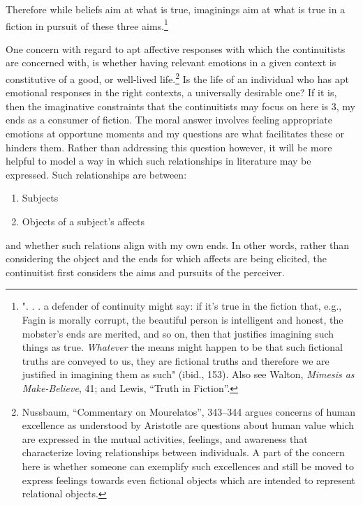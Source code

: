 \documentclass[phdthesis,12pt,final]{wuthesis}
\theoremstyle{definition}
\theoremstyle{definition}
\theoremstyle{definition}
\theoremstyle{definition}
\theoremstyle{remark}
\begin{document}
\noindent Therefore while beliefs aim at what is true, imaginings aim at what is true in a fiction in pursuit of these three aims.\footnote{". . . a defender of continuity might say: if it's true in the fiction that, e.g., Fagin is morally corrupt, the beautiful person is intelligent and honest, the mobster's ends are merited, and so on, then that justifies imagining such things as true. \emph{Whatever} the means might happen to be that such fictional truths are conveyed to us, they are fictional truths and therefore we are justified in imagining them as such" (ibid., 153). Also see Walton, \emph{Mimesis as {Make-Believe}}, 41; and Lewis, {``Truth in {Fiction}''}.}

One concern with regard to apt affective responses with which the continuitists are concerned with, is whether having relevant emotions in a given context is constitutive of a good, or well-lived life.\footnote{Nussbaum, {``Commentary on {Mourelatos}''}, 343--344 argues concerns of human excellence as understood by Aristotle are questions about human value which are expressed in the mutual activities, feelings, and awareness that characterize loving relationships between individuals. A part of the concern here is whether someone can exemplify such excellences and still be moved to express feelings towards even fictional objects which are intended to represent relational objects.} Is the life of an individual who has apt emotional responses in the right contexts, a universally desirable one? If it is, then the imaginative constraints that the continuitists may focus on here is 3, my ends as a consumer of fiction. The moral answer involves feeling appropriate emotions at opportune moments and my questions are what facilitates these or hinders them. Rather than addressing this question however, it will be more helpful to model a way in which such relationships in literature may be expressed. Such relationships are between:

\begin{enumerate}
\def\labelenumi{\arabic{enumi}.}
\tightlist
\item
  Subjects
\item
  Objects of a subject's affects
\end{enumerate}

\noindent and whether such relations align with my own ends. In other words, rather than considering the object and the ends for which affects are being elicited, the continuitist first considers the aims and pursuits of the perceiver.
\end{document}

